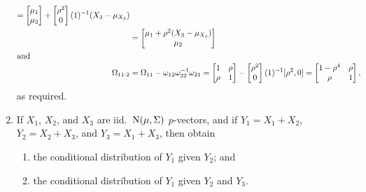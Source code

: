 \begin{enumerate}
\begin{align*}
            =
            \begin{bmatrix}
               \mu_{1} \\
               \mu_{2}
            \end{bmatrix}
            +
            \begin{bmatrix}
               \rho^{2} \\
               0
            \end{bmatrix}
            (1)^{-1}(X_{3}-\mu_{X_{3}})
            \\& 
            =
            \begin{bmatrix}
               \mu_{1}+\rho^{2}(X_{3}-\mu_{X_{3}}) \\
               \mu_{2}
            \end{bmatrix}
            \\
            \shortintertext{and}
            \Omega_{11\cdot 2} & =\Omega_{11}-\omega_{12}\omega_{22}^{-1}\omega_{21}
            =
            \begin{bmatrix}
               1 & \rho \\
               \rho & 1
            \end{bmatrix}
            -
            \begin{bmatrix}
               \rho^{2} \\
               0
            \end{bmatrix}
            (1)^{-1}[\rho^{2},0]
            =
            \begin{bmatrix}
               1-\rho^{4} & \rho \\
               \rho & 1
            \end{bmatrix},
         \end{align*}
         as required.

   \item If \( X_{1} \), \( X_{2} \), and \( X_{3} \) are iid.\ \( \operatorname{N}(\mu,\Sigma) \) \( p 
         \)-vectors, and if \( Y_{1}=X_{1}+X_{2} \), \( Y_{2}=X_{2}+X_{3} \), and \( 
         Y_{3}=X_{1}+X_{3} \), then obtain
         \begin{enumerate}
            \item the conditional distribution of \( Y_{1} \) given \( Y_{2} \); and
         
            \item the conditional distribution of \( Y_{1} \) given \( Y_{2} \) and \( Y_{3} \).
         \end{enumerate}
         

\end{enumerate}
